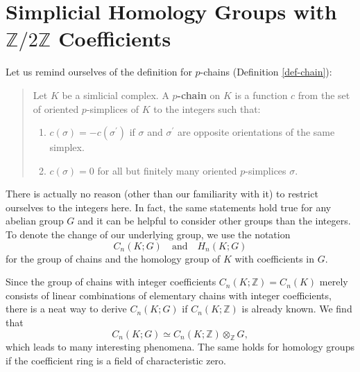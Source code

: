 \documentclass[toc=bib]{scrartcl}
\theoremstyle{plain}
\newtheorem{theorem}{Theorem}[section]
\theoremstyle{definition}
\theoremstyle{remark}
\newcommand{\SH}{Simplicial Homology}
\newcommand{\Z}{\mathbb{Z}}
\newcommand{\qandq}{\quad \text{and} \quad}
\begin{document}
\section{\SH{} Groups with $\mathbb{Z}/2\mathbb{Z}$ Coefficients}

Let us remind ourselves of the definition for $p$-chains (Definition \ref{def-chain}):
\begin{quotation}
	Let $K$ be a simlicial complex. A \textbf{$p$-chain} on $K$ is a function $c$ from the set of oriented $p$-simplices of $K$ to the integers such that:
	\begin{enumerate}
		\item $c(\sigma)=-c(\sigma^\prime)$ if $\sigma$ and $\sigma^\prime$ are opposite orientations of the same simplex.
		\item $c(\sigma)=0$ for all but finitely many oriented $p$-simplices $\sigma$.
	\end{enumerate}
\end{quotation}

There is actually no reason (other than our familiarity with it) to restrict ourselves to the integers here. In fact, the same statements hold true for any abelian group $G$ and it can be helpful to consider other groups than the integers. To denote the change of our underlying group, we use the notation
\[
C_n(K;G)\qandq H_n(K;G)
\]
for the group of chains and the homology group of $K$ with coefficients in $G$.

Since the group of chains with integer coefficients $C_n(K;\Z)=C_n(K)$ merely consists of linear combinations of elementary chains with integer coefficients, there is a neat way to derive $C_n(K;G)$ if $C_n(K;\Z)$ is already known. We find that
\[
C_n(K;G)\simeq C_n(K;\Z)\otimes_\Z G,
\]
which leads to many interesting phenomena. The same holds for homology groups if the coefficient ring is a field of characteristic zero.



%
\end{document}
